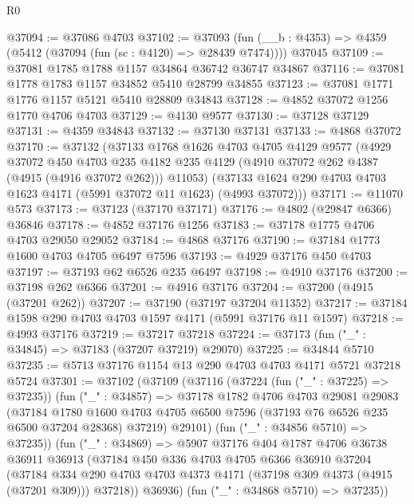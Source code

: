 \begin{lexlean}{R0}
\begin{coremodule}
@37094 := @37086 @4703
@37102 := @37093
    (fun (__b : @4353) => @4359 (@5412 (@37094 (fun (sc : @4120) => @28439 @7474))))
    @37045
@37109 := @37081 @1785 @1788 @1157 @34864 @36742 @36747 @34867
@37116 := @37081 @1778 @1783 @1157 @34852 @5410 @28799 @34855
@37123 := @37081 @1771 @1776 @1157 @5121 @5410 @28809 @34843
@37128 := @4852 @37072 @1256 @1770 @4706 @4703
@37129 := @4130 @9577
@37130 := @37128 @37129
@37131 := @4359 @34843
@37132 := @37130 @37131
@37133 := @4868 @37072
@37170 := @37132
    (@37133
      @1768
      @1626
      @4703
      @4705
      @4129
      @9577
      (@4929
        @37072
        @450
        @4703
        @235
        @4182
        @235
        @4129
        (@4910 @37072 @262 @4387 (@4915 (@4916 @37072 @262)))
        @11053)
      (@37133 @1624 @290 @4703 @4703 @1623 @4171 (@5991 @37072 @11 @1623) (@4993 @37072)))
@37171 := @11070 @573
@37173 := @37123 (@37170 @37171)
@37176 := @4802 (@29847 @6366) @36846
@37178 := @4852 @37176 @1256
@37183 := @37178 @1775 @4706 @4703 @29050 @29052
@37184 := @4868 @37176
@37190 := @37184 @1773 @1600 @4703 @4705 @6497 @7596
@37193 := @4929 @37176 @450 @4703
@37197 := @37193 @62 @6526 @235 @6497
@37198 := @4910 @37176
@37200 := @37198 @262 @6366
@37201 := @4916 @37176
@37204 := @37200 (@4915 (@37201 @262))
@37207 := @37190 (@37197 @37204 @11352)
@37217 := @37184 @1598 @290 @4703 @4703 @1597 @4171 (@5991 @37176 @11 @1597)
@37218 := @4993 @37176
@37219 := @37217 @37218
@37224 := @37173 (fun ("_" : @34845) => @37183 (@37207 @37219) @29070)
@37225 := @34844 @5710
@37235 := @5713 @37176 @1154 @13 @290 @4703 @4703 @4171 @5721 @37218 @5724
@37301 := @37102
    (@37109
      (@37116
        (@37224 (fun ("_" : @37225) => @37235))
        (fun ("_" : @34857) =>
        @37178
          @1782
          @4706
          @4703
          @29081
          @29083
          (@37184
            @1780
            @1600
            @4703
            @4705
            @6500
            @7596
            (@37193 @76 @6526 @235 @6500 @37204 @28368)
            @37219)
          @29101)
        (fun ("_" : @34856 @5710) => @37235))
      (fun ("_" : @34869) =>
      @5907
        @37176
        @404
        @1787
        @4706
        @36738
        @36911
        @36913
        (@37184
          @450
          @336
          @4703
          @4705
          @6366
          @36910
          @37204
          (@37184
            @334
            @290
            @4703
            @4703
            @4373
            @4171
            (@37198 @309 @4373 (@4915 (@37201 @309)))
            @37218))
        @36936)
      (fun ("_" : @34868 @5710) => @37235))

\end{coremodule}
\end{lexlean}
